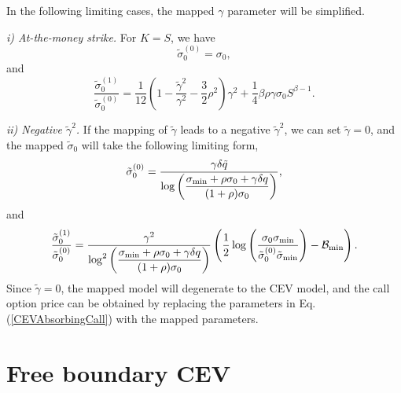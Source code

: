 \documentclass[12pt]{article}
\begin{document}
      In the following limiting cases, the mapped $\gamma$ parameter will be simplified.

      {\it i) At-the-money strike.} For $K=S$, we have
      \begin{equation}
        \tilde{\sigma}_0^{(0)}=\sigma_0,
      \end{equation}
      and
      \begin{equation}
        \frac{\tilde{\sigma}_0^{(1)}}{\tilde{\sigma}_0^{(0)}}=\frac{1}{12}
        \left(1-\frac{\tilde{\gamma}^2}{\gamma^2}-\frac{3}{2}\rho^2\right)\gamma^2
        +\frac{1}{4}\beta\rho\gamma\sigma_0S^{\beta -1}.
      \end{equation}

      {\it ii) Negative $\tilde{\gamma}^2$.} If the mapping of $\tilde{\gamma}$ leads to a
      negative $\tilde{\gamma}^2$, we can set $\tilde{\gamma}=0$, and the mapped $\tilde{\sigma}_0$
      will take the following limiting form,
      \begin{equation}
        \tilde{\sigma}_0^{(0)}=\frac{\gamma\delta\tilde{q}}
        {\displaystyle \log\left(\frac{\sigma_{{\rm min}}+\rho\sigma_0+\gamma\delta q}{(1+\rho)\sigma_0}\right)},
      \end{equation}
      and
      \begin{equation}
        \frac{\tilde{\sigma}_0^{(1)}}{\tilde{\sigma}_0^{(0)}}=\frac{\gamma^2}
        {\displaystyle \log^2\left(\frac{\sigma_{{\rm min}}+\rho\sigma_0+\gamma\delta q}{(1+\rho)\sigma_0}\right)}
        \left(\frac{1}{2}\log\left(\frac{\sigma_0\sigma_{{\rm min}}}{\tilde{\sigma}_0^{(0)}\tilde{\sigma}_{{\rm min}}}\right)
                                                -\mathcal{B}_{{\rm min}}\right).
      \end{equation}
      Since $\tilde{\gamma}=0$, the mapped model will degenerate to the CEV model, and the call option price
      can be obtained by replacing the parameters in Eq. (\ref{CEVAbsorbingCall}) with the mapped parameters.





\section{Free boundary CEV}
\end{document}
